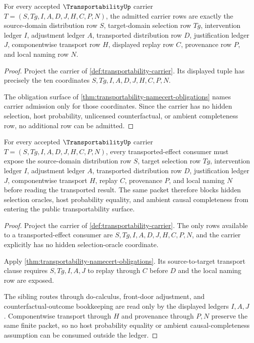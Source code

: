 \begin{theorem}
\label{thm:transportability-carrier-admission}
For every accepted $\TransportabilityUp$ carrier $T=(S,Tg,I,A,D,J,H,C,P,N)$, the admitted carrier rows are exactly the source-domain distribution row $S$, target-domain selection row $Tg$, intervention ledger $I$, adjustment ledger $A$, transported distribution row $D$, justification ledger $J$, componentwise transport row $H$, displayed replay row $C$, provenance row $P$, and local naming row $N$.
\end{theorem}
\begin{proof}
Project the carrier of \autoref{def:transportability-carrier}. Its displayed tuple has precisely the ten coordinates $S,Tg,I,A,D,J,H,C,P,N$.

The obligation surface of \autoref{thm:transportability-namecert-obligations} names carrier admission only for those coordinates. Since the carrier has no hidden selection, host probability, unlicensed counterfactual, or ambient completeness row, no additional row can be admitted.
\end{proof}

\begin{theorem}
\label{thm:transportability-selection-ledger-obligation}
For every accepted $\TransportabilityUp$ carrier $T=(S,Tg,I,A,D,J,H,C,P,N)$, every transported-effect consumer must expose the source-domain distribution row $S$, target selection row $Tg$, intervention ledger $I$, adjustment ledger $A$, transported distribution row $D$, justification ledger $J$, componentwise transport $H$, replay $C$, provenance $P$, and local naming $N$ before reading the transported result. The same packet therefore blocks hidden selection oracles, host probability equality, and ambient causal completeness from entering the public transportability surface.
\end{theorem}
\begin{proof}
Project the carrier of \autoref{def:transportability-carrier}. The only rows available to a transported-effect consumer are $S,Tg,I,A,D,J,H,C,P,N$, and the carrier explicitly has no hidden selection-oracle coordinate.

Apply \autoref{thm:transportability-namecert-obligations}. Its source-to-target transport clause requires $S,Tg,I,A,J$ to replay through $C$ before $D$ and the local naming row are exposed.

The sibling routes through do-calculus, front-door adjustment, and counterfactual-outcome bookkeeping are read only by the displayed ledgers $I,A,J$. Componentwise transport through $H$ and provenance through $P,N$ preserve the same finite packet, so no host probability equality or ambient causal-completeness assumption can be consumed outside the ledger.
\end{proof}


